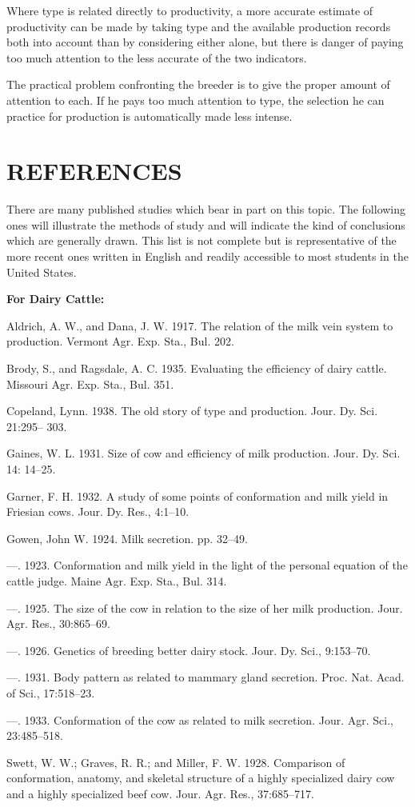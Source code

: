 Where type is related directly to productivity, a more accurate estimate
of productivity can be made by taking type and the available
production records both into account than by considering either alone,
but there is danger of paying too much attention to the less accurate of
the two indicators.

The practical problem confronting the breeder is to give the proper
amount of attention to each. If he pays too much attention to type, the
selection he can practice for production is automatically made less
intense.

\section*{REFERENCES}

There are many published studies which bear in part on this topic.
The following ones will illustrate the methods of study and will indicate
the kind of conclusions which are generally drawn. This list is not
complete but is representative of the more recent ones written in English
and readily accessible to most students in the United States.

\noindent
\textbf{For Dairy Cattle:}

\begin{hangparas}{0.5in}{1}%
Aldrich, A. W., and Dana, J. W. 1917. The relation of the milk vein system to
production. Vermont Agr. Exp. Sta., Bul. 202.

Brody, S., and Ragsdale, A. C. 1935. Evaluating the efficiency of dairy cattle. Missouri
Agr. Exp. Sta., Bul. 351.

Copeland, Lynn. 1938. The old story of type and production. Jour. Dy. Sci. 21:295--
303.

Gaines, W. L. 1931. Size of cow and efficiency of milk production. Jour. Dy. Sci. 14:
14--25.

Garner, F. H. 1932. A study of some points of conformation and milk yield in Friesian
cows. Jour. Dy. Res., 4:1--10.

Gowen, John W. 1924. Milk secretion. pp. 32--49.

---. 1923. Conformation and milk yield in the light of the personal equation
of the cattle judge. Maine Agr. Exp. Sta., Bul. 314.

---. 1925. The size of the cow in relation to the size of her milk production.
Jour. Agr. Res., 30:865--69.

---. 1926. Genetics of breeding better dairy stock. Jour. Dy. Sci., 9:153--70.

---. 1931. Body pattern as related to mammary gland secretion. Proc. Nat.
Acad. of Sci., 17:518--23.

---. 1933. Conformation of the cow as related to milk secretion. Jour. Agr.
Sci., 23:485--518.

Swett, W. W.; Graves, R. R.; and Miller, F. W. 1928. Comparison of conformation,
anatomy, and skeletal structure of a highly specialized dairy cow and a highly
specialized beef cow. Jour. Agr. Res., 37:685--717.
\end{hangparas}

